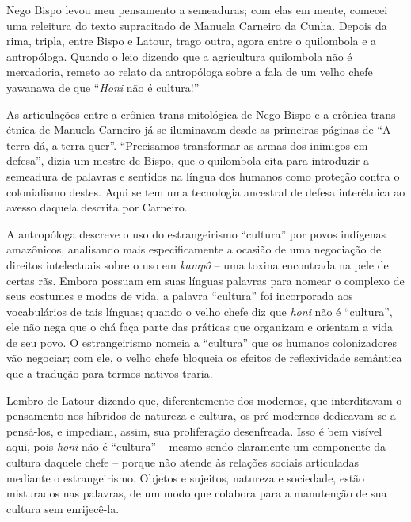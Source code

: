 
Nego Bispo levou meu pensamento a semeaduras; com elas em mente, comecei uma releitura do texto supracitado de Manuela Carneiro da Cunha. Depois da rima, tripla, entre Bispo e Latour, trago outra, agora entre o quilombola e a antropóloga. Quando o leio dizendo que a agricultura quilombola não é mercadoria, remeto ao relato da antropóloga sobre a fala de um velho chefe yawanawa de que \enquote{\textit{Honi} não é cultura!}

As articulações entre a crônica trans-mitológica de Nego Bispo e a crônica trans-étnica de Manuela Carneiro já se iluminavam desde as primeiras páginas de \enquote{A terra dá, a terra quer}. \enquote{Precisamos transformar as armas dos inimigos em defesa}, dizia um mestre de Bispo, que o quilombola cita para introduzir a semeadura de palavras e sentidos na língua dos humanos como proteção contra o colonialismo destes. Aqui se tem uma tecnologia ancestral de defesa interétnica ao avesso daquela descrita por Carneiro.

A antropóloga descreve o uso do estrangeirismo \enquote{cultura} por povos indígenas amazônicos, analisando mais especificamente a ocasião de uma negociação de direitos intelectuais sobre o uso em \textit{kampô} --  uma toxina encontrada na pele de certas rãs. Embora possuam em suas línguas palavras para nomear o complexo de seus costumes e modos de vida, a palavra \enquote{cultura} foi incorporada aos vocabulários de tais línguas; quando o velho chefe diz que \textit{honi} não é \enquote{cultura}, ele não nega que o chá faça parte das práticas que organizam e orientam a vida de seu povo. O estrangeirismo nomeia a \enquote{cultura} que os humanos colonizadores vão negociar; com ele, o velho chefe bloqueia os efeitos de reflexividade semântica que a tradução para termos nativos traria.

Lembro de Latour dizendo que, diferentemente dos modernos, que interditavam o pensamento nos híbridos de natureza e cultura, os pré-modernos dedicavam-se a pensá-los, e impediam, assim, sua proliferação desenfreada. Isso é bem visível aqui, pois \textit{honi} não é \enquote{cultura} -- mesmo sendo claramente um componente da cultura daquele chefe -- porque não atende às relações sociais articuladas mediante o estrangeirismo. Objetos e sujeitos, natureza e sociedade, estão misturados nas palavras, de um modo que colabora para a manutenção de sua cultura sem enrijecê-la.

